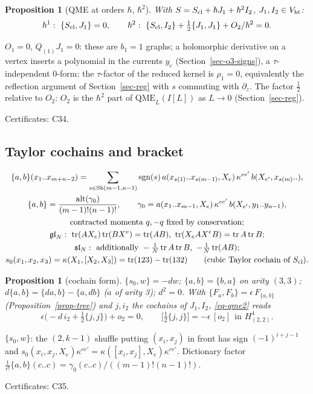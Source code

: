 \documentclass[10pt,a4paper]{article}
\numberwithin{equation}{section}
\newtheorem{proposition}[theorem]{Proposition}
\theoremstyle{definition}
\theoremstyle{remark}
\newcommand{\tr}{\operatorname{tr}}
\newcommand{\alt}{\operatorname{alt}}
\newcommand{\sgn}{\operatorname{sgn}}
\newcommand{\fsl}{\mathfrak{sl}}
\newcommand{\fgl}{\mathfrak{gl}}
\newcommand{\Vht}{V_{\rm ht}}
\newcommand{\cert}[1]{\par\noindent\textup{Certificates: #1.}\par}
\begin{document}
\begin{proposition}[QME at orders $\hbar$, $\hbar^2$]\label{prop-qme}
With $S=S_{\rm cl}+\hbar J_1+\hbar^2I_2$, $J_1,I_2\in\Vht$:
\begin{equation}
\hbar^1:\ \{S_{\rm cl},J_1\}=0,\qquad \hbar^2:\ \{S_{\rm cl},I_2\}+\tfrac12\{J_1,J_1\}+O_2/\hbar^2=0 .\label{eq-qme2}
\end{equation}
\end{proposition}
$O_1=0$, $Q_{(1)}J_1=0$: these are $b_1=1$ graphs; a holomorphic derivative on a vertex inserts a polynomial in the currents $y_e$ (Section~\ref{sec-o3-signs}), a $\tau$-independent $0$-form; the $\tau$-factor of the reduced kernel is $\rho_1=0$, equivalently the reflection argument of Section~\ref{sec-reg} with $s$ commuting with $\partial_z$. The factor $\frac12$ relative to $O_2$: $O_2$ is the $\hbar^2$ part of $\mathrm{QME}_L(I[L])$ as $L\to0$ (Section~\ref{sec-reg}).
\cert{C34}

\subsection{Taylor cochains and bracket}

\begin{gather}
\{a,b\}(x_1..x_{m+n-2})=\sum_{s\in{\rm Sh}(m-1,n-1)}\sgn(s)\,a(x_{s(1)}..x_{s(m-1)},X_e)\,\kappa^{ee'}\,b(X_{e'},x_{s(m)}..),\\
\{a,b\}=\frac{\alt(\gamma_0)}{(m-1)!(n-1)!},\qquad
\gamma_0=a(x_1..x_{m-1},X_e)\,\kappa^{ee'}\,b(X_{e'},y_1..y_{n-1}),\\ \text{contracted momenta }q,-q\text{ fixed by conservation};\\
\fgl_N:\ \tr(AX_e)\tr(BX^e)=\tr(AB),\ \tr(X_eAX^eB)=\tr A\tr B;\\
\fsl_N:\ \text{additionally }-\tfrac1N\tr A\tr B,\ -\tfrac1N\tr(AB);\\
s_0(x_1,x_2,x_3)=\kappa(X_1,[X_2,X_3])=\tr(123)-\tr(132)\qquad(\text{cubic Taylor cochain of }S_{\rm cl}).
\end{gather}

\begin{proposition}[cochain form]\label{prop-cochain}
$\{s_0,w\}=-dw$; $\{a,b\}=\{b,a\}$ on arity $(3,3)$; $d\{a,b\}=\{da,b\}-\{a,db\}$ ($a$ of arity 3); $d^2=0$. With $\{F_a,F_b\}=\epsilon\,F_{\{a,b\}}$ (Proposition~\ref{prop-tree}) and $j,i_2$ the cochains of $J_1,I_2$, \eqref{eq-qme2} reads
\begin{equation}
\epsilon\big(-d\,i_2+\tfrac12\{j,j\}\big)+o_2=0,\qquad \big[\tfrac12\{j,j\}\big]=-\epsilon\,[o_2]\ \ \text{in }H^4_{(2,2)} .\label{eq-cochain}
\end{equation}
\end{proposition}
$\{s_0,w\}$: the $(2,k-1)$ shuffle putting $(x_i,x_j)$ in front has sign $(-1)^{i+j-1}$ and $s_0(x_i,x_j,X_e)\kappa^{ee'}=\kappa([x_i,x_j],X_e)\kappa^{ee'}$. Dictionary factor $\frac1{r!}\{a,b\}(c..c)=\gamma_0(c..c)/((m-1)!(n-1)!)$.
\cert{C35}
\end{document}
